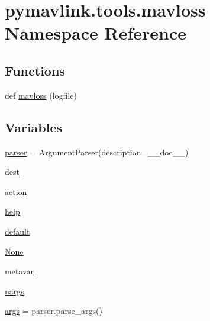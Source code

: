 \hypertarget{namespacepymavlink_1_1tools_1_1mavloss}{}\section{pymavlink.\+tools.\+mavloss Namespace Reference}
\label{namespacepymavlink_1_1tools_1_1mavloss}
\subsection*{Functions}
\begin{DoxyCompactItemize}
\item 
def \mbox{\hyperlink{namespacepymavlink_1_1tools_1_1mavloss_ad6189b16a6cc39452070425c82c2835b}{mavloss}} (logfile)
\end{DoxyCompactItemize}
\subsection*{Variables}
\begin{DoxyCompactItemize}
\item 
\mbox{\hyperlink{namespacepymavlink_1_1tools_1_1mavloss_a18a84b3878825da57160d0632e8ff588}{parser}} = Argument\+Parser(description=\+\_\+\+\_\+doc\+\_\+\+\_\+)
\item 
\mbox{\hyperlink{namespacepymavlink_1_1tools_1_1mavloss_afeaad40440b5921fecfefc93f1c7eb0c}{dest}}
\item 
\mbox{\hyperlink{namespacepymavlink_1_1tools_1_1mavloss_abff94434dd555bd0ba23238ace34276a}{action}}
\item 
\mbox{\hyperlink{namespacepymavlink_1_1tools_1_1mavloss_ab24353ddcd0cce32222d80b6d0c6f5d8}{help}}
\item 
\mbox{\hyperlink{namespacepymavlink_1_1tools_1_1mavloss_a7c23ea39f412ae4fcb49b27358edc6c7}{default}}
\item 
\mbox{\hyperlink{namespacepymavlink_1_1tools_1_1mavloss_a30c16deeeea6d839d98c79ad4ce6641f}{None}}
\item 
\mbox{\hyperlink{namespacepymavlink_1_1tools_1_1mavloss_a69f1ccbd115ecbf2058ebabdc5963701}{metavar}}
\item 
\mbox{\hyperlink{namespacepymavlink_1_1tools_1_1mavloss_ac1b3dfe0b27639570492159679be1dd7}{nargs}}
\item 
\mbox{\hyperlink{namespacepymavlink_1_1tools_1_1mavloss_aed811b3edcca8ba1e47ca484ae0aad4c}{args}} = parser.\+parse\+\_\+args()
\end{DoxyCompactItemize}


